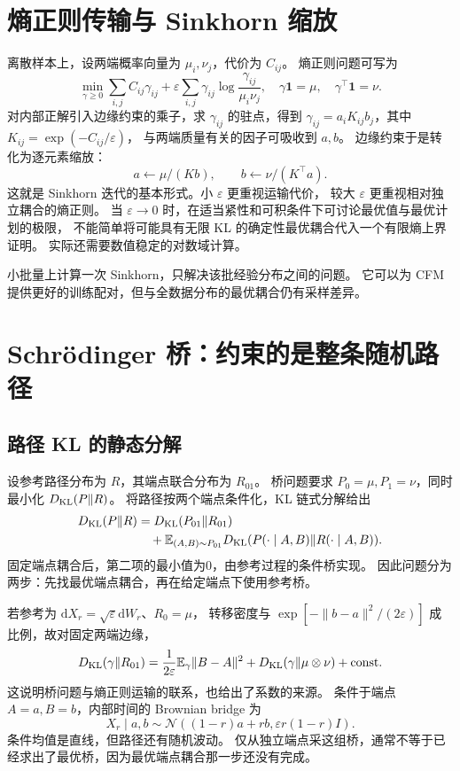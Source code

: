 \section{熵正则传输与 Sinkhorn 缩放}
离散样本上，设两端概率向量为 $\mu_i,\nu_j$，代价为 $C_{ij}$。
熵正则问题可写为
\[
\min_{\gamma\geq0}\sum_{i,j}C_{ij}\gamma_{ij}
 +\varepsilon\sum_{i,j}\gamma_{ij}\log\frac{\gamma_{ij}}{\mu_i\nu_j},
\quad \gamma\mathbf1=\mu,\quad\gamma^\top\mathbf1=\nu.
\]
对内部正解引入边缘约束的乘子，求 $\gamma_{ij}$ 的驻点，得到
$\gamma_{ij}=a_iK_{ij}b_j$，其中 $K_{ij}=\exp(-C_{ij}/\varepsilon)$，
与两端质量有关的因子可吸收到 $a,b$。
边缘约束于是转化为逐元素缩放：
\[
a\leftarrow\mu/(Kb),\qquad b\leftarrow\nu/(K^\top a).
\]
这就是 Sinkhorn 迭代的基本形式。小 $\varepsilon$ 更重视运输代价，
较大 $\varepsilon$ 更重视相对独立耦合的熵正则。
当 $\varepsilon\to0$ 时，在适当紧性和可积条件下可讨论最优值与最优计划的极限，
不能简单将可能具有无限 KL 的确定性最优耦合代入一个有限熵上界证明。
实际还需要数值稳定的对数域计算。

小批量上计算一次 Sinkhorn，只解决该批经验分布之间的问题。
它可以为 CFM 提供更好的训练配对，但与全数据分布的最优耦合仍有采样差异。

\section{Schrödinger 桥：约束的是整条随机路径}
\subsection{路径 KL 的静态分解}
设参考路径分布为 $R$，其端点联合分布为 $R_{01}$。
桥问题要求 $P_0=\mu,P_1=\nu$，同时最小化 $D_{\rm KL}(P\|R)$。
将路径按两个端点条件化，KL 链式分解给出
\begin{align}
D_{\rm KL}(P\|R)
 &=D_{\rm KL}(P_{01}\|R_{01})\\
 &\quad+\mathbb E_{(A,B)\sim P_{01}}
 D_{\rm KL}(P(\cdot\mid A,B)\|R(\cdot\mid A,B)).
\end{align}
固定端点耦合后，第二项的最小值为0，由参考过程的条件桥实现。
因此问题分为两步：先找最优端点耦合，再在给定端点下使用参考桥。

若参考为 $\mathrm dX_r=\sqrt\varepsilon\mathrm dW_r$、$R_0=\mu$，
转移密度与 $\exp[-\|b-a\|^2/(2\varepsilon)]$ 成比例，故对固定两端边缘，
\[
D_{\rm KL}(\gamma\|R_{01})
=\frac1{2\varepsilon}\mathbb E_\gamma\|B-A\|^2
 +D_{\rm KL}(\gamma\|\mu\otimes\nu)+\text{const}.
\]
这说明桥问题与熵正则运输的联系，也给出了系数的来源。
条件于端点 $A=a,B=b$，内部时间的 Brownian bridge 为
\[
X_r\mid a,b\sim\mathcal N((1-r)a+rb,\varepsilon r(1-r)I).
\]
条件均值是直线，但路径还有随机波动。
仅从独立端点采这组桥，通常不等于已经求出了最优桥，因为最优端点耦合那一步还没有完成。

